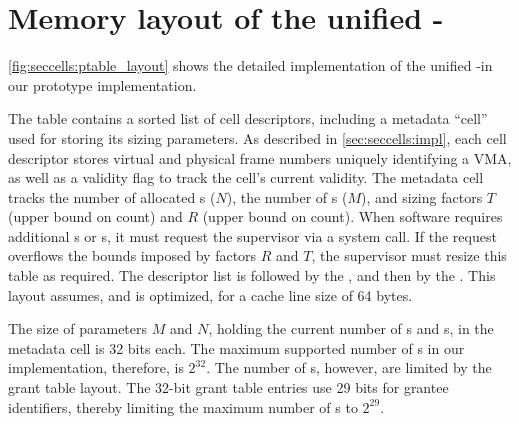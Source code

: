 \section{Memory layout of the unified \ptable-\gtable}
\label{app:seccells:ptable}

\autoref{fig:seccells:ptable_layout} shows the detailed implementation of the
unified \ptable-\gtable in our prototype \seccells implementation.

The table contains a sorted list of cell descriptors, including a
metadata ``cell'' used for storing its sizing parameters.
As described in \autoref{sec:seccells:impl}, each cell descriptor stores virtual 
and physical frame numbers uniquely identifying a VMA, as well as a 
validity flag to track the cell's current validity.
The metadata cell tracks the number of allocated \cell{}s ($N$), the
number of \secdiv{}s ($M$), and sizing factors $T$ (upper bound on \cell count)
and $R$ (upper bound on \secdiv count).
When software requires additional \secdiv{}s or \cell{}s, it must request
the supervisor via a system call.
If the request overflows the bounds imposed by factors $R$ and $T$, the
supervisor must resize this table as required.
The \cell descriptor list is followed by the \ptable, and then by the
\gtable.
This layout assumes, and is optimized, for a cache line size of 64 bytes.

The size of parameters $M$ and $N$, holding the current number of \cell{}s
and \secdiv{}s, in the metadata cell is 32 bits each.
The maximum supported number of \cell{}s in our implementation, therefore,
is $2^{32}$.
The number of \secdiv{}s, however, are limited by the grant table layout.
The 32-bit grant table entries use 29 bits for grantee \secdiv{} identifiers,
thereby limiting the maximum number of \secdiv{}s to $2^{29}$.


